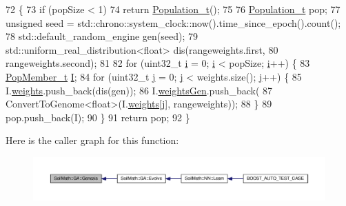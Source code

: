 \begin{DoxyCode}
72                                            \{
73   \textcolor{keywordflow}{if} (popSize < 1)
74     \textcolor{keywordflow}{return} \hyperlink{_soil_math_types_8h_a8d2d4c736cf817d048a2d66dec8b12ec}{Population\_t}();
75 
76   \hyperlink{_soil_math_types_8h_a8d2d4c736cf817d048a2d66dec8b12ec}{Population\_t} pop;
77   \textcolor{keywordtype}{unsigned} seed = std::chrono::system\_clock::now().time\_since\_epoch().count();
78   std::default\_random\_engine gen(seed);
79   std::uniform\_real\_distribution<float> dis(rangeweights.first,
80                                             rangeweights.second);
81 
82   \textcolor{keywordflow}{for} (uint32\_t \hyperlink{_comparision_pictures_2_createtest_image_8m_a6f6ccfcf58b31cb6412107d9d5281426}{i} = 0; \hyperlink{_comparision_pictures_2_createtest_image_8m_a6f6ccfcf58b31cb6412107d9d5281426}{i} < popSize; \hyperlink{_comparision_pictures_2_createtest_image_8m_a6f6ccfcf58b31cb6412107d9d5281426}{i}++) \{
83     \hyperlink{struct_pop_member_struct}{PopMember\_t} \hyperlink{_comparision_pictures_2_createtest_image_8m_aa7400a30a3cc1d4ef58923b44ecb7719}{I};
84     \textcolor{keywordflow}{for} (uint32\_t \hyperlink{_comparision_pictures_2_createtest_image_8m_ac86694252f8dfdb19aaeadc4b7c342c6}{j} = 0; \hyperlink{_comparision_pictures_2_createtest_image_8m_ac86694252f8dfdb19aaeadc4b7c342c6}{j} < weights.size(); \hyperlink{_comparision_pictures_2_createtest_image_8m_ac86694252f8dfdb19aaeadc4b7c342c6}{j}++) \{
85       I.\hyperlink{struct_pop_member_struct_aeba960170ef60a906c730cc24cd90367}{weights}.push\_back(dis(gen));
86       I.\hyperlink{struct_pop_member_struct_a072fadb4863e0cf77b55ad3b46b62522}{weightsGen}.push\_back(
87           ConvertToGenome<float>(I.\hyperlink{struct_pop_member_struct_aeba960170ef60a906c730cc24cd90367}{weights}[\hyperlink{_comparision_pictures_2_createtest_image_8m_ac86694252f8dfdb19aaeadc4b7c342c6}{j}], rangeweights));
88     \}
89     pop.push\_back(I);
90   \}
91   \textcolor{keywordflow}{return} pop;
92 \}
\end{DoxyCode}


Here is the caller graph for this function\+:\nopagebreak
\begin{figure}[H]
\begin{center}
\leavevmode
\includegraphics[width=350pt]{class_soil_math_1_1_g_a_a96cfe7cc5b3028a66b0136e72ea38cbc_icgraph}
\end{center}
\end{figure}


